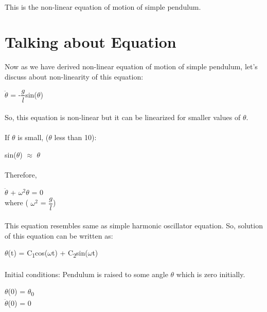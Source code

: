 \documentclass{article}
\begin{document}
\paragraph{} This is the non-linear equation of motion of simple pendulum.



\section{Talking about Equation}
Now as we have derived non-linear equation of motion of simple pendulum, let's discuss about non-linearity of this equation:
\begin{center}$\ddot{\theta}$ = -$\dfrac{g}{l}$sin($\theta$)\end{center}
\paragraph{}So, this equation is non-linear but it can be linearized for smaller values of $\theta$.
\paragraph{}If $\theta$ is small, ($\theta$ less than 10\degree):
\begin{center}
sin($\theta$) $\approx$ $\theta$
\end{center}

\paragraph{}Therefore,
\begin{center}
$\ddot{\theta}$ + $\omega^2\theta$ = 0 \\  where ( $\omega^2$ = $\dfrac{g}{l}$)
\end{center}

\paragraph{}This equation resembles same as simple harmonic oscillator equation. So, solution of this equation can be written as:
\begin{center}
$\theta$(t) = C\textsubscript{1}cos($\omega$t) + C\textsubscript{2}sin($\omega$t)
\end{center}
\paragraph{}Initial conditions: Pendulum is raised to some angle $\theta$ which is zero initially.
\begin{center}
$\theta$(0) = $\theta$\textsubscript{0}
\\$\ddot{\theta}$(0) = 0  
\end{center}
\end{document}
